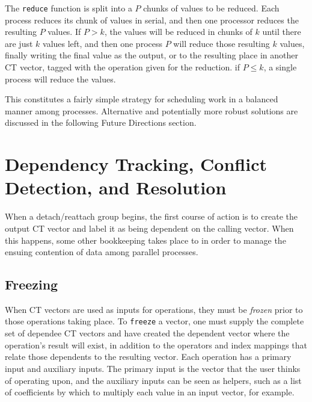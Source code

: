 The \texttt{reduce} function is split into a $P$ chunks of values to be reduced.
Each process reduces its chunk of values in serial, and then one processor
reduces the resulting $P$ values. If $P > k$, the values will be
reduced in chunks of $k$ until there are just $k$ values left, and then one
process $P$ will reduce those resulting $k$ values, finally writing the final
value as the output, or to the resulting place in another CT vector, tagged
with the operation given for the reduction. if $P \leq k$, a single process will
reduce the values.

This constitutes a fairly simple strategy for scheduling work in a balanced
manner among processes. Alternative and potentially more robust solutions are
discussed in the following Future Directions section.

\section{Dependency Tracking, Conflict Detection, and Resolution}
When a detach/reattach group begins, the first course of action is to create
the output CT vector and label it as being dependent on the calling vector.
When this happens, some other bookkeeping takes place to in order to manage the
ensuing contention of data among parallel processes.

\subsection{Freezing}
When CT vectors are used as inputs for operations, they must be \textit{frozen}
prior to those operations taking place. To \texttt{freeze} a vector, one must supply the
complete set of dependee CT vectors and have created the dependent vector where the
operation's result will exist, in addition to the operators and index mappings
that relate those dependents to the resulting vector. Each operation has a
primary input and auxiliary inputs. The primary input is the vector that the
user thinks of operating upon, and the auxiliary inputs can be seen as helpers,
such as a list of coefficients by which to multiply each value in an input
vector, for example.

